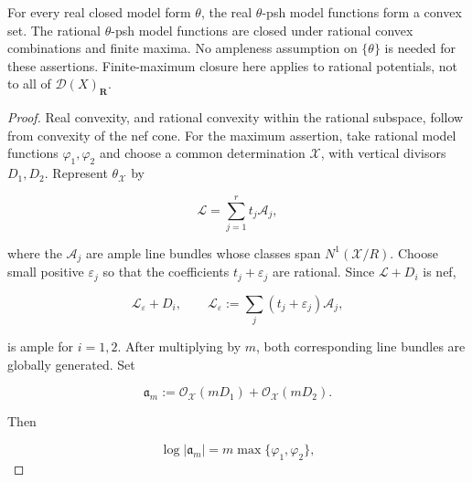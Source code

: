 \begin{proposition}\label{prop:ch20-model-max}
For every real closed model form $\theta$, the real $\theta$-psh
model functions form a convex set.  The rational $\theta$-psh model
functions are closed under rational convex combinations and finite maxima.
No ampleness assumption on $\{\theta\}$ is needed for these assertions.
Finite-maximum closure here applies to rational potentials, not to all of
$\mathcal D(X)_{\mathbf R}$.
\end{proposition}

\begin{proof}
Real convexity, and rational convexity within the rational subspace,
follow from convexity of the nef cone.  For the maximum assertion, take
rational model functions
$\varphi_1,\varphi_2$ and choose a common determination
$\mathcal X$, with vertical divisors $D_1,D_2$.  Represent
$\theta_{\mathcal X}$ by

\begin{equation}
\label{eq:ch20-ample-basis}
                    \mathcal L=\sum_{j=1}^r t_j\mathcal A_j,
\end{equation}

where the $\mathcal A_j$ are ample line bundles whose classes span
$N^1(\mathcal X/R)$.  Choose small positive $\varepsilon_j$ so that
the coefficients $t_j+\varepsilon_j$ are rational.  Since
$\mathcal L+D_i$ is nef,

\begin{equation}
\label{eq:ch20-ample-perturbation}
              \mathcal L_\varepsilon+D_i,
              \qquad
              \mathcal L_\varepsilon
                :=\sum_j(t_j+\varepsilon_j)\mathcal A_j,
\end{equation}

is ample for $i=1,2$.  After multiplying by $m$, both corresponding
line bundles are globally generated.  Set

\begin{equation}
\label{eq:ch20-max-ideal}
 \mathfrak a_m
   :=\mathcal O_{\mathcal X}(mD_1)
       +\mathcal O_{\mathcal X}(mD_2).
\end{equation}

Then

\begin{equation}
\label{eq:ch20-max-ideal-function}
             \log|\mathfrak a_m|
                  =m\max\{\varphi_1,\varphi_2\},
\end{equation}


\end{proof}
